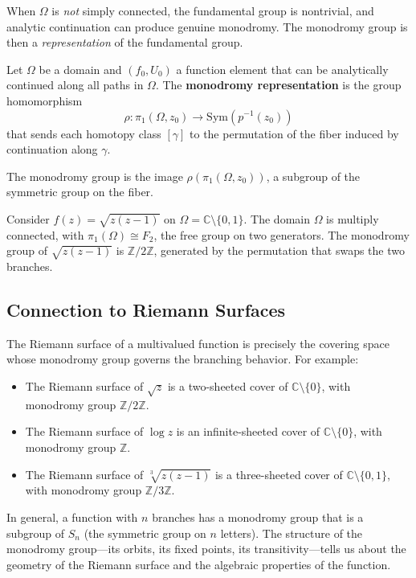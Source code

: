 When $\Omega$ is \emph{not} simply connected, the fundamental group is nontrivial, and analytic continuation can produce genuine monodromy. The monodromy group is then a \emph{representation} of the fundamental group.

\begin{definition}
Let $\Omega$ be a domain and $(f_0, U_0)$ a function element that can be analytically continued along all paths in $\Omega$. The \textbf{monodromy representation} is the group homomorphism
\[
    \rho \colon \pi_1(\Omega, z_0) \to \mathrm{Sym}(p^{-1}(z_0))
\]
that sends each homotopy class $[\gamma]$ to the permutation of the fiber induced by continuation along $\gamma$.
\end{definition}

The monodromy group is the image $\rho(\pi_1(\Omega, z_0))$, a subgroup of the symmetric group on the fiber.

\begin{example}
Consider $f(z) = \sqrt{z(z-1)}$ on $\Omega = \mathbb{C} \setminus \{0, 1\}$. The domain $\Omega$ is multiply connected, with $\pi_1(\Omega) \cong F_2$, the free group on two generators. The monodromy group of $\sqrt{z(z-1)}$ is $\mathbb{Z}/2\mathbb{Z}$, generated by the permutation that swaps the two branches.
\end{example}

\subsection{Connection to Riemann Surfaces}

The Riemann surface of a multivalued function is precisely the covering space whose monodromy group governs the branching behavior. For example:

\begin{itemize}
    \item The Riemann surface of $\sqrt{z}$ is a two-sheeted cover of $\mathbb{C} \setminus \{0\}$, with monodromy group $\mathbb{Z}/2\mathbb{Z}$.
    \item The Riemann surface of $\log z$ is an infinite-sheeted cover of $\mathbb{C} \setminus \{0\}$, with monodromy group $\mathbb{Z}$.
    \item The Riemann surface of $\sqrt[3]{z(z-1)}$ is a three-sheeted cover of $\mathbb{C} \setminus \{0, 1\}$, with monodromy group $\mathbb{Z}/3\mathbb{Z}$.
\end{itemize}

In general, a function with $n$ branches has a monodromy group that is a subgroup of $S_n$ (the symmetric group on $n$ letters). The structure of the monodromy group---its orbits, its fixed points, its transitivity---tells us about the geometry of the Riemann surface and the algebraic properties of the function.

